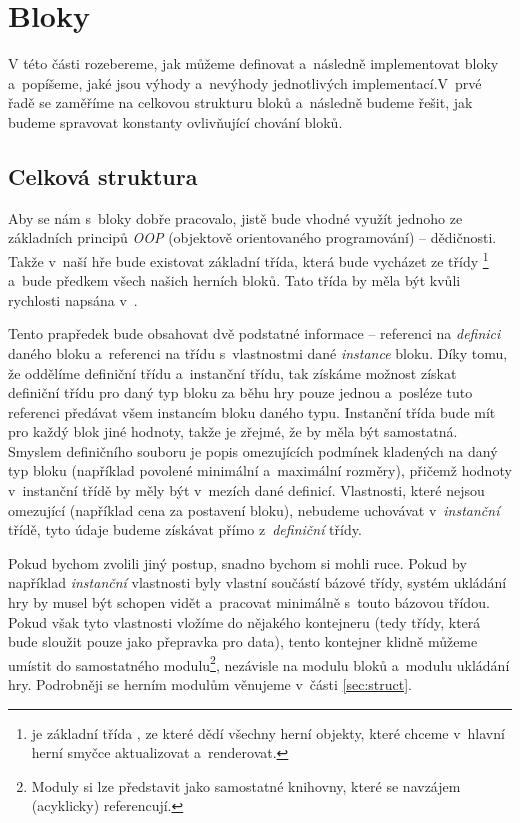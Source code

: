 
\section{Bloky}

V této části rozebereme, jak můžeme definovat a~následně implementovat bloky a~popíšeme, jaké jsou výhody a~nevýhody jednotlivých implementací.\linebreak V~prvé řadě se zaměříme na celkovou strukturu bloků a~následně budeme řešit, jak budeme spravovat konstanty ovlivňující chování bloků.

\subsection{Celková struktura}

Aby se nám s~bloky dobře pracovalo, jistě bude vhodné využít jednoho ze základních principů \textit{OOP} (objektově orientovaného programování) -- dědičnosti. Takže v~naší hře bude existovat základní třída, která bude vycházet ze třídy \footnote{ je základní třída \UEu{}, ze které dědí všechny herní objekty, které chceme v~hlavní herní smyčce aktualizovat a~renderovat.} a~bude předkem všech našich herních bloků. Tato třída by měla být kvůli rychlosti napsána v~\CPP{}.

Tento prapředek bude obsahovat dvě podstatné informace -- referenci na \textit{definici} daného bloku a~referenci na třídu s~vlastnostmi dané \textit{instance} bloku. Díky tomu, že oddělíme definiční třídu a~instanční třídu, tak získáme možnost získat definiční třídu pro daný typ bloku za běhu hry pouze jednou a~posléze tuto referenci předávat všem instancím bloku daného typu. Instanční třída bude mít pro každý blok jiné hodnoty, takže je zřejmé, že by měla být samostatná. Smyslem definičního souboru je popis omezujících podmínek kladených na daný typ bloku (například povolené minimální a~maximální rozměry), přičemž hodnoty v~instanční třídě by měly být v~mezích dané definicí. Vlastnosti, které nejsou omezující (například cena za postavení bloku), nebudeme uchovávat v~\textit{instanční} třídě, tyto údaje budeme získávat přímo z~\textit{definiční} třídy.

Pokud bychom zvolili jiný postup, snadno bychom si mohli  ruce. Pokud by například \textit{instanční} vlastnosti byly vlastní součástí bázové třídy, systém ukládání hry by musel být schopen vidět a~pracovat minimálně s~touto bázovou třídou. Pokud však tyto vlastnosti vložíme do nějakého kontejneru (tedy třídy, která bude sloužit pouze jako přepravka pro data), tento kontejner klidně můžeme umístit do samostatného modulu\footnote{Moduly si lze představit jako samostatné knihovny, které se navzájem (acyklicky) referencují.}, nezávisle na modulu bloků a~modulu ukládání hry. Podrobněji se herním modulům věnujeme v~části \ref{sec:struct}.

